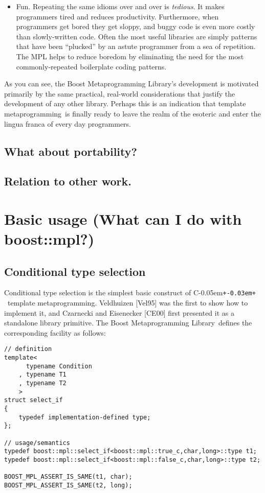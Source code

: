 \documentclass{netobjectdays}
\newcommand{\Cpp}{C\kern-0.05em\texttt{+\kern-0.03em+}%
}
\newcommand{\Mpl}{Boost Meta\-program\-ming Library}
\newcommand{\mping}{meta\-program\-ming}
\begin{document}
\begin{itemize}
\item Fun. Repeating the same idioms over and over is
  \emph{tedious}. It makes programmers tired and reduces
  productivity. Furthermore, when programmers get bored they get
  sloppy, and buggy code is even more costly than slowly-written
  code. Often the most useful libraries are simply patterns that have
  been ``plucked'' by an astute programmer from a sea of
  repetition. The MPL helps to reduce boredom by eliminating the need
  for the most commonly-repeated boilerplate coding patterns.

\end{itemize}

As you can see, the \Mpl's development is motivated primarily by the
same practical, real-world considerations that justify the development
of any other library. Perhaps this is an indication that template
\mping\ is finally ready to leave the realm of the esoteric and enter
the lingua franca of every day programmers.

\subsection{What about portability? }

\subsection{Relation to other work.}

\section{Basic usage (What can I do with boost::mpl?)}

\subsection{Conditional type selection}

Conditional type selection is the simplest basic construct of \Cpp\
template \mping{}. Veldhuizen [Vel95] was the first to show 
how to implement it, and Czarnecki and Eisenecker [CE00] first 
presented it as a standalone library primitive. The \Mpl\ defines the 
corresponding facility as follows:

{\footnotesize
\begin{verbatim}
// definition
template<
      typename Condition
    , typename T1
    , typename T2
    >
struct select_if
{
    typedef implementation-defined type;
};

// usage/semantics
typedef boost::mpl::select_if<boost::mpl::true_c,char,long>::type t1;
typedef boost::mpl::select_if<boost::mpl::false_c,char,long>::type t2;

BOOST_MPL_ASSERT_IS_SAME(t1, char);
BOOST_MPL_ASSERT_IS_SAME(t2, long);
\end{verbatim}
}
\end{document}

